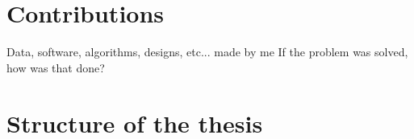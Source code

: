 
\section{Contributions}
Data, software, algorithms, designs, etc... made by me
If the problem was solved, how was that done?

\section{Structure of the thesis}


